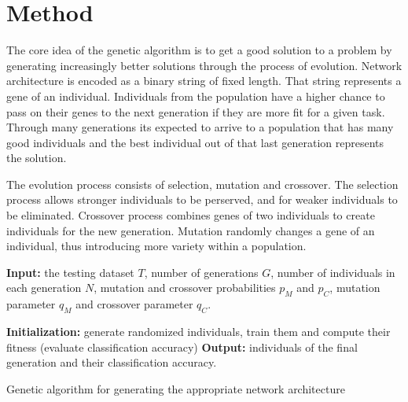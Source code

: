\documentclass[eng]{simposium}
\begin{document}
\section{Method}


The core idea of the genetic algorithm is to get a good solution to a problem by generating increasingly better solutions through the process of evolution.
Network architecture is encoded as a binary string of fixed length. That string represents a gene of an individual.
Individuals from the population have a higher chance to pass on their genes to the next generation if they are more fit for a given task.
Through many generations its expected to arrive to a population that has many good individuals and the best individual out of that last generation represents the solution.

The evolution process consists of selection, mutation and crossover. 
The selection process allows stronger individuals to be perserved, and for weaker individuals to be eliminated.
Crossover process combines genes of two individuals to create individuals for the new generation.
Mutation randomly changes a gene of an individual, thus introducing more variety within a population.


\begin{algorithm}[H]
    \SetAlgoLined
    \textbf{Input:} the testing dataset $T$, number of generations $G$, number of individuals in each generation $N$,
    mutation and crossover probabilities $p_M$ and $p_C$, mutation parameter $q_M$ and crossover parameter $q_C$.

    \textbf{Initialization:} generate randomized individuals, train them and compute their fitness (evaluate classification accuracy)\;
     \textbf{Output:} individuals of the final generation and their classification accuracy.
     \caption{Genetic algorithm for generating the appropriate network architecture}
\end{algorithm}
\end{document}
